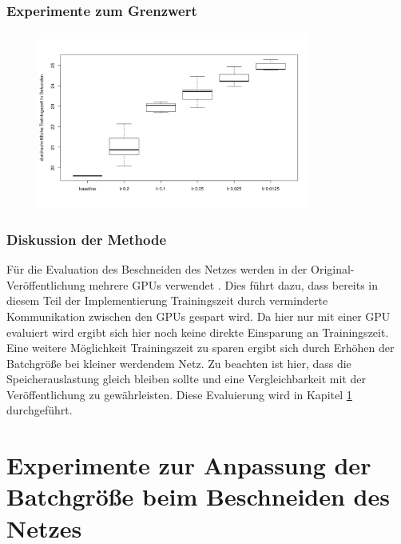  
 
 \subsubsection{Experimente zum Grenzwert}


\begin{figure}[h]
 \centering
 \includegraphics[width=0.8\textwidth]{KapitelPartB/Images/lr1.png}
 \label{ref:lra}
\end{figure}



 

\subsubsection{Diskussion der Methode}

Für die Evaluation des Beschneiden des Netzes werden in der Original-Veröffentlichung mehrere GPUs verwendet \cite{prunetrain}. Dies führt dazu, dass bereits in diesem Teil der Implementierung Trainingszeit durch verminderte Kommunikation zwischen den GPUs gespart wird. Da hier nur mit einer GPU evaluiert wird ergibt sich hier noch keine direkte Einsparung an Trainingszeit. Eine weitere Möglichkeit Trainingszeit zu sparen ergibt sich durch Erhöhen der Batchgröße bei kleiner werdendem Netz. Zu beachten ist hier, dass die Speicherauslastung gleich bleiben sollte und eine Vergleichbarkeit mit der Veröffentlichung zu gewährleisten. Diese Evaluierung wird in Kapitel \ref{sec:ptnew} durchgeführt.


\section{Experimente zur Anpassung der Batchgröße beim Beschneiden des Netzes}\label{sec:ptnew}
\color{black}

